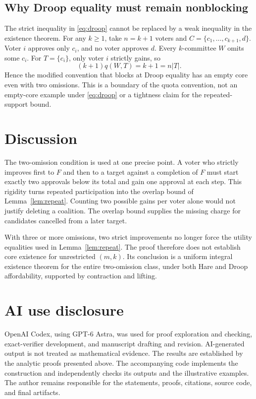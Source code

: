 \documentclass[11pt]{article}
\begin{document}
\subsection{Why Droop equality must remain nonblocking}
The strict inequality in \eqref{eq:droop} cannot be replaced by a
weak inequality in the existence theorem. For any $k\ge1$, take
$n=k+1$ voters and $C=\{c_1,\ldots,c_{k+1},d\}$.
Voter $i$ approves only $c_i$, and no voter approves $d$.
Every $k$-committee $W$ omits some $c_i$. For $T=\{c_i\}$,
only voter $i$ strictly gains, so
\[
 (k+1)q(W,T)=k+1=n|T|.
\]
Hence the modified convention that blocks at Droop equality has an
empty core even with two omissions. This is a boundary of the quota
convention, not an empty-core example under \eqref{eq:droop} or a
tightness claim for the repeated-support bound.

\section{Discussion}
The two-omission condition is used at one precise point. A voter who
strictly improves first to $F$ and then to a target against a completion
of $F$ must start exactly two approvals below its total and gain one
approval at each step. This rigidity turns repeated participation into
the overlap bound of Lemma~\ref{lem:repeat}. Counting two possible gains
per voter alone would not justify deleting a coalition. The overlap
bound supplies the missing charge for candidates cancelled from a
later target.

With three or more omissions, two strict improvements no longer force
the utility equalities used in Lemma~\ref{lem:repeat}. The proof therefore
does not establish core existence for unrestricted $(m,k)$. Its conclusion
is a uniform integral existence theorem for the entire two-omission class,
under both Hare and Droop affordability, supported by contraction and lifting.

\section*{AI use disclosure}

OpenAI Codex, using GPT-6 Astra, was used for proof exploration and
checking, exact-verifier development, and manuscript drafting and revision.
AI-generated output is not treated as mathematical evidence. The results
are established by the analytic proofs presented above. The accompanying
code implements the construction and independently checks its outputs and
the illustrative examples. The author remains
responsible for the statements, proofs, citations, source code, and final
artifacts.
\end{document}
